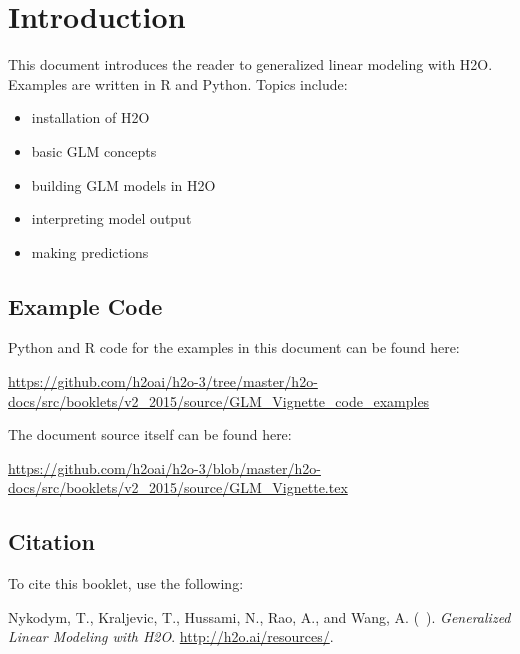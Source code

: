 \newpage

\section{Introduction}
This document introduces the reader to generalized linear modeling with H2O.  Examples are written in R and Python.
Topics include: 
\begin{itemize}
\item installation of H2O
\item basic GLM concepts
\item building GLM models in H2O
\item interpreting model output
\item making predictions
\end{itemize}








\subsection{Example Code}

Python and R code for the examples in this document can be found here:

\url{https://github.com/h2oai/h2o-3/tree/master/h2o-docs/src/booklets/v2_2015/source/GLM_Vignette_code_examples}

The document source itself can be found here:

\url{https://github.com/h2oai/h2o-3/blob/master/h2o-docs/src/booklets/v2_2015/source/GLM_Vignette.tex}

\newpage
\subsection{Citation}

To cite this booklet, use the following: 

Nykodym, T.,  Kraljevic, T., Hussami, N., Rao, A.,  and Wang, A. (\shortmonthname\ \the\year). {\textit{Generalized Linear Modeling with H2O}}. {\url{http://h2o.ai/resources/}}.

